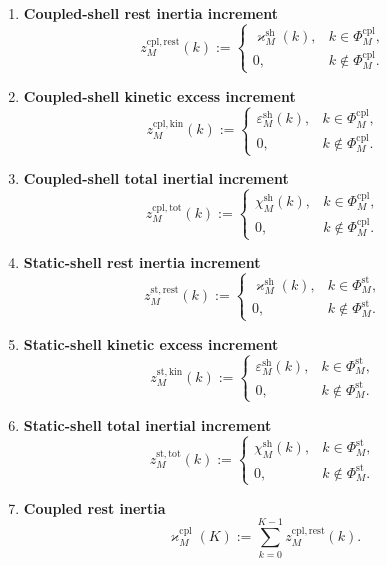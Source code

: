 \documentclass[11pt,letterpaper]{article}
\theoremstyle{plain}
\theoremstyle{definition}
\theoremstyle{remark}
\newcommand{\RestInertia}{\varkappa}
\newcommand{\TotInertia}{\chi}
\newcommand{\KinExcess}{\varepsilon}
\newcommand{\CoupledState}{\Phi^{\mathrm{cpl}}}
\newcommand{\StaticState}{\Phi^{\mathrm{st}}}
\begin{document}
\begin{enumerate}[resume]
\item \textbf{Coupled-shell rest inertia increment}
\[
z_M^{\mathrm{cpl,rest}}(k)
:=
\begin{cases}
\RestInertia_M^{\mathrm{sh}}(k),& k\in\CoupledState_M,\\
0,& k\notin\CoupledState_M.
\end{cases}
\]

\item \textbf{Coupled-shell kinetic excess increment}
\[
z_M^{\mathrm{cpl,kin}}(k)
:=
\begin{cases}
\KinExcess_M^{\mathrm{sh}}(k),& k\in\CoupledState_M,\\
0,& k\notin\CoupledState_M.
\end{cases}
\]

\item \textbf{Coupled-shell total inertial increment}
\[
z_M^{\mathrm{cpl,tot}}(k)
:=
\begin{cases}
\TotInertia_M^{\mathrm{sh}}(k),& k\in\CoupledState_M,\\
0,& k\notin\CoupledState_M.
\end{cases}
\]

\item \textbf{Static-shell rest inertia increment}
\[
z_M^{\mathrm{st,rest}}(k)
:=
\begin{cases}
\RestInertia_M^{\mathrm{sh}}(k),& k\in\StaticState_M,\\
0,& k\notin\StaticState_M.
\end{cases}
\]

\item \textbf{Static-shell kinetic excess increment}
\[
z_M^{\mathrm{st,kin}}(k)
:=
\begin{cases}
\KinExcess_M^{\mathrm{sh}}(k),& k\in\StaticState_M,\\
0,& k\notin\StaticState_M.
\end{cases}
\]

\item \textbf{Static-shell total inertial increment}
\[
z_M^{\mathrm{st,tot}}(k)
:=
\begin{cases}
\TotInertia_M^{\mathrm{sh}}(k),& k\in\StaticState_M,\\
0,& k\notin\StaticState_M.
\end{cases}
\]

\item \textbf{Coupled rest inertia}
\[
\RestInertia_M^{\mathrm{cpl}}(K):=\sum_{k=0}^{K-1}z_M^{\mathrm{cpl,rest}}(k).
\]


\end{enumerate}
\end{document}
